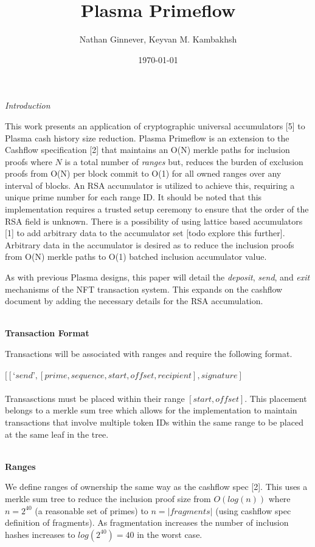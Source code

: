 \documentclass[12pt]{article}
\title{Plasma Primeflow}
\author{Nathan Ginnever, Keyvan M. Kambakhsh}
\date{\today}
\begin{document}
\maketitle
\centerline{\textit{Introduction}}

This work presents an application of cryptographic universal accumulators [5] to Plasma cash history size reduction. Plasma Primeflow is an extension to the Cashflow specification [2] that maintains an O(N) merkle paths for inclusion proofs where $N$ is a total number of \textit{ranges} but, reduces the burden of exclusion proofs from O(N) per block commit to O(1) for all owned ranges over any interval of blocks. An RSA accumulator is utilized to achieve this, requiring a unique prime number for each range ID. It should be noted that this implementation requires a trusted setup ceremony to ensure that the order of the RSA field is unknown. There is a possibility of using lattice based accumulators [1] to add arbitrary data to the accumulator set [todo explore this further]. Arbitrary data in the accumulator is desired as to reduce the inclusion proofs from O(N) merkle paths to O(1) batched inclusion accumulator value. 

As with previous Plasma designs, this paper will detail the \textit{deposit}, \textit{send}, and \textit{exit} mechanisms of the NFT transaction system. This expands on the cashflow document by adding the necessary details for the RSA accumulation.
\\
\\
\centerline{\textbf{Transaction Format}}

Transactions will be associated with ranges and require the following format.
\\
\\
$[[‘send’, [prime, sequence, start, offset, recipient], signature]$
\\
\\
Transasctions must be placed within their range $[start, offset]$. This placement belongs to a merkle sum tree which allows for the implementation to maintain transactions that involve multiple token IDs within the same range to be placed at the same leaf in the tree.
\\
\\
\centerline{\textbf{Ranges}}

We define ranges of ownership the same way as the cashflow spec [2]. This uses a merkle sum tree to reduce the inclusion proof size from $O(log(n))$ where $n = 2^{40}$ (a reasonable set of primes) to $n = |fragments|$ (using cashflow spec definition of fragments). As fragmentation increases the number of inclusion hashes increases to $log(2^{40}) = 40$ in the worst case. 
\end{document}
